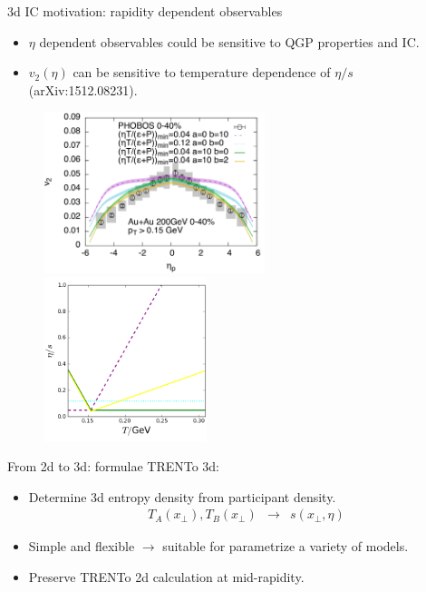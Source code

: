 \documentclass[11pt]{beamer}
\begin{document}
\begin{frame}{3d IC motivation: rapidity dependent observables}
\begin{itemize}
\item $\eta$ dependent observables could be sensitive to QGP properties and IC.
\item $v_2(\eta)$ can be sensitive to temperature dependence of $\eta/s$ (arXiv:1512.08231).
\end{itemize}
\begin{center}
\begin{figure}
\includegraphics[width=0.575\textwidth]{./pics/Bjorn-v2-eta.png}
\includegraphics[width=0.425\textwidth]{./pics/etaS-Bjorn.png}
\end{figure}
\end{center}
\end{frame}

\begin{frame}{From 2d to 3d: formulae}
TRENTo 3d:
\begin{itemize}
\item  Determine 3d entropy density from participant density.
\begin{eqnarray}
\nonumber
	T_A(x_\perp), T_B(x_\perp) &\rightarrow& s(x_\perp, \eta)
\end{eqnarray}
\item Simple and flexible $\rightarrow$ suitable for parametrize a variety of models.
\item Preserve TRENTo 2d calculation at mid-rapidity.
\end{itemize}
\end{frame}
\end{document}
